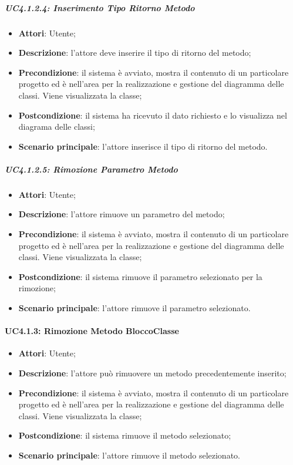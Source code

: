 \subparagraph{UC4.1.2.4: Inserimento Tipo Ritorno Metodo}
\label{UC4.1.2.4}
\begin{itemize}
	\item \textbf{Attori}: Utente;
	\item \textbf{Descrizione}: l'attore deve inserire il tipo di ritorno del metodo;
	\item \textbf{Precondizione}: il sistema è avviato, mostra il contenuto di un particolare progetto ed è nell'area per la realizzazione e gestione del diagramma delle classi. Viene visualizzata la classe;
	\item \textbf{Postcondizione}: il sistema ha ricevuto il dato richiesto e lo visualizza nel diagrama delle classi;
	\item \textbf{Scenario principale}: l'attore inserisce il tipo di ritorno del metodo.
\end{itemize}

\subparagraph{UC4.1.2.5: Rimozione Parametro Metodo}
\label{UC4.1.2.5}
\begin{itemize}
	\item \textbf{Attori}: Utente;
	\item \textbf{Descrizione}: l'attore rimuove un parametro del metodo;
	\item \textbf{Precondizione}: il sistema è avviato, mostra il contenuto di un particolare progetto ed è nell'area per la realizzazione e gestione del diagramma delle classi. Viene visualizzata la classe;
	\item \textbf{Postcondizione}: il sistema rimuove il parametro selezionato per la rimozione;
	\item \textbf{Scenario principale}: l'attore rimuove il parametro selezionato.
\end{itemize}

\paragraph{UC4.1.3: Rimozione Metodo BloccoClasse}
\label{UC4.1.3}
\begin{itemize}
	\item \textbf{Attori}: Utente;
	\item \textbf{Descrizione}: l'attore può rimuovere un metodo precedentemente inserito;
	\item \textbf{Precondizione}: il sistema è avviato, mostra il contenuto di un particolare progetto ed è nell'area per la realizzazione e gestione del diagramma delle classi. Viene visualizzata la classe;
	\item \textbf{Postcondizione}: il sistema rimuove il metodo selezionato;
	\item \textbf{Scenario principale}: l'attore rimuove il metodo selezionato.
\end{itemize}

